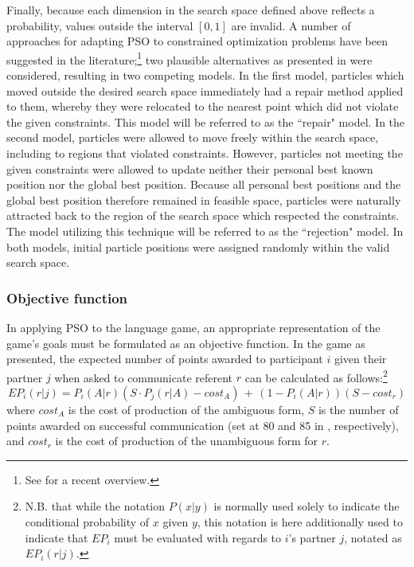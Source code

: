 \documentclass[12pt,a4paper]{article}
\begin{document}
Finally, because each dimension in the search space defined above reflects a probability, values outside the interval $[0, 1]$ are invalid. A number of approaches for adapting PSO to constrained optimization problems have been suggested in the literature;\footnote{See \cite{helwig2010} for a recent overview.} two plausible alternatives as presented in \cite{engelbrecht2005} were considered, resulting in two competing models. 
In the first model, particles which moved outside the desired search space immediately had a repair method applied to them, whereby they were relocated to the nearest point which did not violate the given constraints. This model will be referred to as the ``repair" model. In the second model, particles were allowed to move freely within the search space, including to regions that violated constraints. However, particles not meeting the given constraints were allowed to update neither their personal best known position nor the global best position. Because all personal best positions and the global best position therefore remained in feasible space, particles were naturally attracted back to the region of the search space which respected the constraints. The model utilizing this technique will be referred to as the ``rejection" model. In both models, initial particle positions were assigned randomly within the valid search space.


 
\subsubsection{Objective function}
\label{sec:objective_func}
In applying PSO to the \citeauthor{rohde2012} language game, an appropriate representation of the game's goals must be formulated as an objective function. In the game as presented, the expected number of points awarded to participant $i$ given their partner $j$ when asked to communicate referent $r$ can be calculated as follows:\footnote{N.B. that while the notation $P(x|y)$ is normally used solely to indicate the conditional probability of $x$ given $y$, this notation is here additionally used to indicate that $EP_i$ must be evaluated with regards to $i$'s partner $j$, notated as $EP_{i}(r|j)$.}
\begin{equation}
EP_{i}(r|j) = P_i(A|r)(S \cdot P_j(r|A) - cost_A) \,+\, (1 - P_i(A|r))(S - cost_r) 
\end{equation}
where $cost_A$ is the cost of production of the ambiguous form, $S$ is the number of points awarded on successful communication (set at 80 and 85 in \citeauthor{rohde2012}, respectively), and $cost_r$ is the cost of production of the unambiguous form for $r$.
\end{document}
